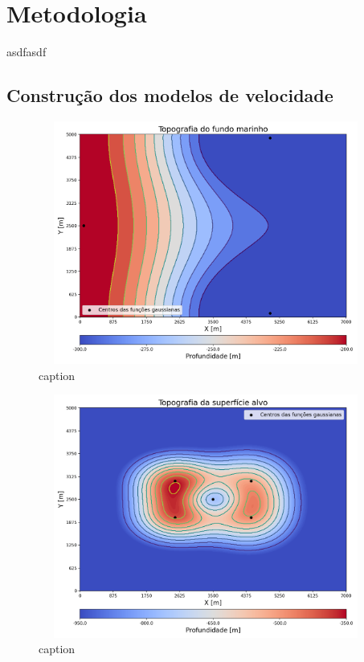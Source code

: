 \chapter{Metodologia}
\label{ch:metodologia}

asdfasdf

\section{Construção dos modelos de velocidade}

\begin{figure}[H]
	\centering
	\includegraphics[width=11cm,height=8cm]{Imgs/Metodologia/water_bottom_surface_gaussian.png}
	\caption{caption}
	\label{fig:}	
\end{figure}


\begin{figure}[H]
	\centering
	\includegraphics[width=11cm,height=8cm]{Imgs/Metodologia/target_surface_gaussian.png}
	\caption{caption}
	\label{fig:}	
\end{figure}


